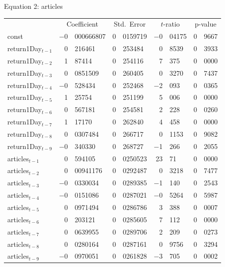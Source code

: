 \begin{center}

Equation 2: articles\\

\vspace{1em}

\begin{tabular}{lr@{.}lr@{.}lr@{.}lr@{.}l}
    &
    \multicolumn{2}{c}{Coefficient} &
    \multicolumn{2}{c}{Std.\ Error} &
    \multicolumn{2}{c}{$t$-ratio} &
    \multicolumn{2}{c}{p-value} \\[1ex]
const &
    $-$0&000666807 &
    0&0159719 &
        $-$0&04175 &
        0&9667 \\
return1Day$_{t-1}$ &
    0&216461 &
    0&253484 &
        0&8539 &
        0&3933 \\
return1Day$_{t-2}$ &
    1&87414 &
    0&254116 &
        7&375 &
        0&0000 \\
return1Day$_{t-3}$ &
    0&0851509 &
    0&260405 &
        0&3270 &
        0&7437 \\
return1Day$_{t-4}$ &
    $-$0&528434 &
    0&252468 &
        $-$2&093 &
        0&0365 \\
return1Day$_{t-5}$ &
    1&25754 &
    0&251199 &
        5&006 &
        0&0000 \\
return1Day$_{t-6}$ &
    0&567181 &
    0&254581 &
        2&228 &
        0&0260 \\
return1Day$_{t-7}$ &
    1&17170 &
    0&262840 &
        4&458 &
        0&0000 \\
return1Day$_{t-8}$ &
    0&0307484 &
    0&266717 &
        0&1153 &
        0&9082 \\
return1Day$_{t-9}$ &
    $-$0&340330 &
    0&268727 &
        $-$1&266 &
        0&2055 \\
articles$_{t-1}$ &
    0&594105 &
    0&0250523 &
        23&71 &
        0&0000 \\
articles$_{t-2}$ &
    0&00941176 &
    0&0292487 &
        0&3218 &
        0&7477 \\
articles$_{t-3}$ &
    $-$0&0330034 &
    0&0289385 &
        $-$1&140 &
        0&2543 \\
articles$_{t-4}$ &
    $-$0&0151086 &
    0&0287021 &
        $-$0&5264 &
        0&5987 \\
articles$_{t-5}$ &
    0&0971494 &
    0&0286786 &
        3&388 &
        0&0007 \\
articles$_{t-6}$ &
    0&203121 &
    0&0285605 &
        7&112 &
        0&0000 \\
articles$_{t-7}$ &
    0&0639955 &
    0&0289706 &
        2&209 &
        0&0273 \\
articles$_{t-8}$ &
    0&0280164 &
    0&0287161 &
        0&9756 &
        0&3294 \\
articles$_{t-9}$ &
    $-$0&0970051 &
    0&0261828 &
        $-$3&705 &
        0&0002 \\
\end{tabular}


\end{center}
